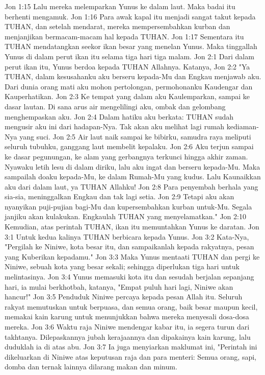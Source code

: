 Jon 1:15  Lalu mereka melemparkan Yunus ke dalam laut. Maka badai itu berhenti mengamuk.
Jon 1:16  Para awak kapal itu menjadi sangat takut kepada TUHAN, dan setelah mendarat, mereka mempersembahkan kurban dan menjanjikan bermacam-macam hal kepada TUHAN.
Jon 1:17  Sementara itu TUHAN mendatangkan seekor ikan besar yang menelan Yunus. Maka tinggallah Yunus di dalam perut ikan itu selama tiga hari tiga malam.
Jon 2:1  Dari dalam perut ikan itu, Yunus berdoa kepada TUHAN Allahnya. Katanya,
Jon 2:2  "Ya TUHAN, dalam kesusahanku aku berseru kepada-Mu dan Engkau menjawab aku. Dari dunia orang mati aku mohon pertolongan, permohonanku Kaudengar dan Kauperhatikan.
Jon 2:3  Ke tempat yang dalam aku Kaulemparkan, sampai ke dasar lautan. Di sana arus air mengelilingi aku, ombak dan gelombang menghempaskan aku.
Jon 2:4  Dalam hatiku aku berkata: TUHAN sudah mengusir aku ini dari hadapan-Nya. Tak akan aku melihat lagi rumah kediaman-Nya yang suci.
Jon 2:5  Air laut naik sampai ke bibirku, samudra raya meliputi seluruh tubuhku, ganggang laut membelit kepalaku.
Jon 2:6  Aku terjun sampai ke dasar pegunungan, ke alam yang gerbangnya terkunci hingga akhir zaman. Nyawaku letih lesu di dalam diriku, lalu aku ingat dan berseru kepada-Mu. Maka sampailah doaku kepada-Mu, ke dalam Rumah-Mu yang kudus. Lalu Kaunaikkan aku dari dalam laut, ya TUHAN Allahku!
Jon 2:8  Para penyembah berhala yang sia-sia, meninggalkan Engkau dan tak lagi setia.
Jon 2:9  Tetapi aku akan nyanyikan puji-pujian bagi-Mu dan kupersembahkan kurban untuk-Mu. Segala janjiku akan kulakukan. Engkaulah TUHAN yang menyelamatkan."
Jon 2:10  Kemudian, atas perintah TUHAN, ikan itu memuntahkan Yunus ke daratan.
Jon 3:1  Untuk kedua kalinya TUHAN berbicara kepada Yunus.
Jon 3:2  Kata-Nya, "Pergilah ke Niniwe, kota besar itu, dan sampaikanlah kepada rakyatnya, pesan yang Kuberikan kepadamu."
Jon 3:3  Maka Yunus mentaati TUHAN dan pergi ke Niniwe, sebuah kota yang besar sekali; sehingga diperlukan tiga hari untuk melintasinya.
Jon 3:4  Yunus memasuki kota itu dan sesudah berjalan sepanjang hari, ia mulai berkhotbah, katanya, "Empat puluh hari lagi, Niniwe akan hancur!"
Jon 3:5  Penduduk Niniwe percaya kepada pesan Allah itu. Seluruh rakyat memutuskan untuk berpuasa, dan semua orang, baik besar maupun kecil, memakai kain karung untuk menunjukkan bahwa mereka menyesali dosa-dosa mereka.
Jon 3:6  Waktu raja Niniwe mendengar kabar itu, ia segera turun dari takhtanya. Dilepaskannya jubah kerajaannya dan dipakainya kain karung, lalu duduklah ia di atas abu.
Jon 3:7  Ia juga menyiarkan maklumat ini, "Perintah ini dikeluarkan di Niniwe atas keputusan raja dan para menteri: Semua orang, sapi, domba dan ternak lainnya dilarang makan dan minum.
